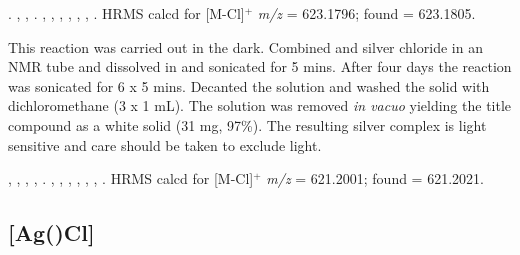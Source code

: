 .
,
,
.
,
,
,
,
,
,
.
HRMS calcd for  [M-Cl]$^+$ \emph{m/z} = 623.1796; found = 623.1805.



This reaction was carried out in the dark.  Combined \tBusixantphos{} and silver chloride in an NMR tube and dissolved in  and sonicated for 5 mins.  After four days the reaction was sonicated for 6 x 5 mins.  Decanted the solution and washed the solid with dichloromethane (3 x 1 mL).  The solution was removed \emph{in vacuo} yielding the title compound as a white solid (31 mg, 97\%).  The resulting silver complex is light sensitive and care should be taken to exclude light.

,
,
,
,
.
,
,
,
,
,
,
.
HRMS calcd for  [M-Cl]$^+$ \emph{m/z} = 621.2001; found = 621.2021.


\subsection*{[Ag(\tBuxantphos)Cl]}

